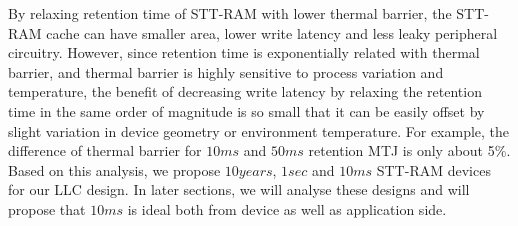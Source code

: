 By relaxing retention time of STT-RAM with lower thermal barrier, the STT-RAM cache can have smaller
area, lower write latency and less leaky peripheral circuitry. However, since retention time is
exponentially related with thermal barrier, and thermal barrier is highly sensitive to process
variation and temperature, the benefit of decreasing write latency by relaxing the retention time in
the same order of magnitude is so small that it can be easily offset by slight variation in device
geometry or environment temperature. For example, the difference of thermal barrier for $10ms$ and
$50ms$ retention MTJ is only about 5\%.
Based on this analysis, we propose $10years$, $1sec$ and $10ms$ STT-RAM devices for our
LLC design. In later sections, we will analyse these designs and will propose that $10ms$ is ideal
both from device as well as application side. 
